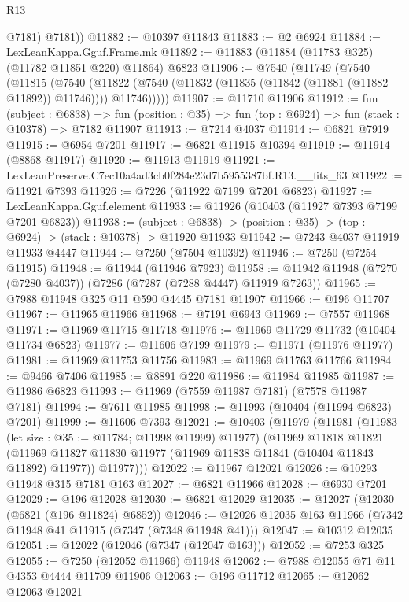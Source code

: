 \begin{lexlean}{R13}
\begin{coremodule}
          @7181)
        @7181))
@11882 := @10397 @11843
@11883 := @2 @6924
@11884 := LexLeanKappa.Gguf.Frame.mk
@11892 := @11883 (@11884 (@11783 @325) (@11782 @11851 @220) @11864) @6823
@11906 := @7540
    (@11749
      (@7540
        (@11815
          (@7540
            (@11822 (@7540 (@11832 (@11835 (@11842 (@11881 (@11882 @11892)) @11746)))) @11746)))))
@11907 := @11710 @11906
@11912 := fun (subject : @6838) =>
  fun (position : @35) => fun (top : @6924) => fun (stack : @10378) => @7182 @11907
@11913 := @7214 @4037
@11914 := @6821 @7919
@11915 := @6954 @7201
@11917 := @6821 @11915 @10394
@11919 := @11914 (@8868 @11917)
@11920 := @11913 @11919
@11921 := LexLeanPreserve.C7ec10a4ad3cb0f284e23d7b5955387bf.R13.__fits_63
@11922 := @11921 @7393
@11926 := @7226 (@11922 @7199 @7201 @6823)
@11927 := LexLeanKappa.Gguf.element
@11933 := @11926 (@10403 (@11927 @7393 @7199 @7201 @6823))
@11938 := (subject : @6838) ->
  (position : @35) -> (top : @6924) -> (stack : @10378) -> @11920 @11933
@11942 := @7243 @4037 @11919 @11933 @4447
@11944 := @7250 (@7504 @10392)
@11946 := @7250 (@7254 @11915)
@11948 := @11944 (@11946 @7923)
@11958 := @11942 @11948 (@7270 (@7280 @4037)) (@7286 (@7287 (@7288 @4447) @11919 @7263))
@11965 := @7988 @11948 @325 @11 @590 @4445 @7181 @11907
@11966 := @196 @11707
@11967 := @11965 @11966
@11968 := @7191 @6943
@11969 := @7557 @11968
@11971 := @11969 @11715 @11718
@11976 := @11969 @11729 @11732 (@10404 @11734 @6823)
@11977 := @11606 @7199
@11979 := @11971 (@11976 @11977)
@11981 := @11969 @11753 @11756
@11983 := @11969 @11763 @11766
@11984 := @9466 @7406
@11985 := @8891 @220
@11986 := @11984 @11985
@11987 := @11986 @6823
@11993 := @11969 (@7559 @11987 @7181) (@7578 @11987 @7181)
@11994 := @7611 @11985
@11998 := @11993 (@10404 (@11994 @6823) @7201)
@11999 := @11606 @7393
@12021 := @10403
    (@11979
      (@11981
        (@11983 (let size : @35 := @11784; @11998 @11999) @11977)
        (@11969
          @11818
          @11821
          (@11969 @11827 @11830 @11977 (@11969 @11838 @11841 (@10404 @11843 @11892) @11977))
          @11977)))
@12022 := @11967 @12021
@12026 := @10293 @11948 @315 @7181 @163
@12027 := @6821 @11966
@12028 := @6930 @7201
@12029 := @196 @12028
@12030 := @6821 @12029
@12035 := @12027 (@12030 (@6821 (@196 @11824) @6852))
@12046 := @12026 @12035 @163 @11966 (@7342 @11948 @41 @11915 (@7347 (@7348 @11948 @41)))
@12047 := @10312 @12035
@12051 := @12022 (@12046 (@7347 (@12047 @163)))
@12052 := @7253 @325
@12055 := @7250 (@12052 @11966) @11948
@12062 := @7988 @12055 @71 @11 @4353 @4444 @11709 @11906
@12063 := @196 @11712
@12065 := @12062 @12063 @12021

\end{coremodule}
\end{lexlean}
